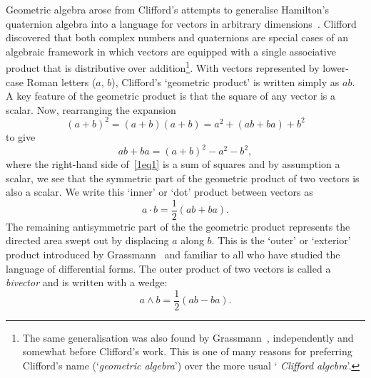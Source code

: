 \documentclass[a4paper]{article}
\numberwithin{equation}{section}
\newcommand{\dt}{\! \cdot \!}
\newcommand{\wdg}{\! \wedge \!}
\newcommand{\half}{{\textstyle \frac{1}{2}}}
\newcommand{\eqv}{=}
\begin{document}
Geometric algebra arose from Clifford's attempts to generalise
Hamilton's quaternion algebra into a language for vectors in arbitrary
dimensions~\cite{cli1878}.  Clifford discovered that both complex
numbers and quaternions are special cases of an algebraic framework in
which vectors are equipped with a single associative product that is
distributive over addition\footnote{The same generalisation was also
found by Grassmann~\cite{gra1877}, independently and somewhat before
Clifford's work.  This is one of many reasons for preferring
Clifford's name (`{\em geometric algebra}') over the more usual `{\em
Clifford algebra}'.}.  With vectors represented by lower-case Roman
letters ($a$, $b$), Clifford's `geometric product' is written simply
as $ab$.  A key feature of the geometric product is that the square of
any vector is a scalar.  Now, rearranging the expansion
%
\begin{equation}
(a + b)^2 = (a+b)(a+b) = a^2 + (ab + ba) + b^2
\end{equation}
%
to give
%
\begin{equation}
ab + ba = (a + b)^2 - a^2 - b^2,
\label{1eq1}
\end{equation}
%
where the right-hand side of~\eqref{1eq1} is a sum of squares and by
assumption a scalar, we see that the symmetric part of the geometric
product of two vectors is also a scalar.  We write this `inner' or
`dot' product between vectors as
%
\begin{equation}
a \dt b \eqv \half (ab + ba).
\label{1dot}
\end{equation}
%
The remaining antisymmetric part of the the geometric product
represents the directed area swept out by displacing $a$ along $b$.
This is the `outer' or `exterior' product introduced by
Grassmann~\cite{gra1877} and familiar to all who have studied the
language of differential forms.  The outer product of two vectors is
called a {\em bivector\/} and is written with a wedge:
%
\begin{equation}
a \wdg b \eqv \half (ab - ba).
\label{1wdg}
\end{equation}
\end{document}
